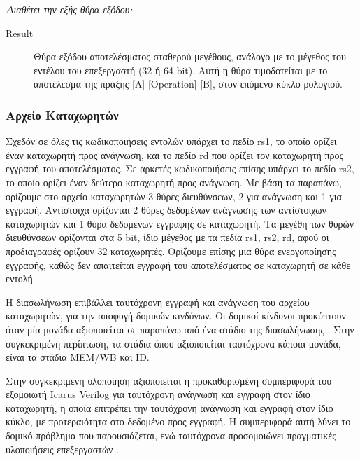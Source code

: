 \documentclass[11pt]{extarticle}
\begin{document}
\textit{Διαθέτει την εξής θύρα εξόδου:}
\begin{description}
 \item[Result] Θύρα εξόδου αποτελέσματος σταθερού μεγέθους, ανάλογο με το μέγεθος του εντέλου του επεξεργαστή (32 ή 64 bit). \newline
Αυτή η θύρα τιμοδοτείται με το αποτέλεσμα της πράξης [Α] [Operation] [B], στον επόμενο κύκλο ρολογιού. 
\end{description}


\subsubsection{Αρχείο Καταχωρητών}
Σχεδόν σε όλες τις κωδικοποιήσεις εντολών υπάρχει το πεδίο rs1, το οποίο ορίζει έναν καταχωρητή προς ανάγνωση, και το πεδίο rd που ορίζει τον καταχωρητή προς εγγραφή του αποτελέσματος.
Σε αρκετές κωδικοποιήσεις επίσης υπάρχει το πεδίο rs2, το οποίο ορίζει έναν δεύτερο καταχωρητή προς ανάγνωση.
Με βάση τα παραπάνω, ορίζουμε στο αρχείο καταχωρητών 3 θύρες διευθύνσεων, 2 για ανάγνωση και 1 για εγγραφή.
Αντίστοιχα ορίζονται 2 θύρες δεδομένων ανάγνωσης των αντίστοιχων καταχωρητών και 1 θύρα δεδομένων εγγραφής σε καταχωρητή.
Τα μεγέθη των θυρών διευθύνσεων ορίζονται στα 5 bit, ίδιο μέγεθος με τα πεδία rs1, rs2, rd, αφού οι προδιαγραφές ορίζουν 32 καταχωρητές.
Ορίζουμε επίσης μια θύρα ενεργοποίησης εγγραφής, καθώς δεν απαιτείται εγγραφή του αποτελέσματος σε καταχωρητή σε κάθε εντολή.

Η διασωλήνωση επιβάλλει ταυτόχρονη εγγραφή και ανάγνωση του αρχείου καταχωρητών, για την αποφυγή δομικών κινδύνων.
Οι δομικοί κίνδυνοι προκύπτουν όταν μία μονάδα αξιοποιείται σε παραπάνω από ένα στάδιο της διασωλήνωσης \cite{nikolos}.
Στην συγκεκριμένη περίπτωση, τα στάδια όπου αξιοποιείται ταυτόχρονα κάποια μονάδα, είναι τα στάδια MEM/WB και ID.

Στην συγκεκριμένη υλοποίηση αξιοποιείται η προκαθορισμένη συμπεριφορά του εξομοιωτή Icarus Verilog για ταυτόχρονη ανάγνωση και εγγραφή στον ίδιο καταχωρητή, η οποία επιτρέπει την ταυτόχρονη ανάγνωση και εγγραφή στον ίδιο κύκλο, με προτεραιότητα στο δεδομένο προς εγγραφή.
Η συμπεριφορά αυτή λύνει το δομικό πρόβλημα που παρουσιάζεται, ενώ ταυτόχρονα προσομοιώνει πραγματικές υλοποιήσεις επεξεργαστών \cite{patterson}. \newline
\end{document}
